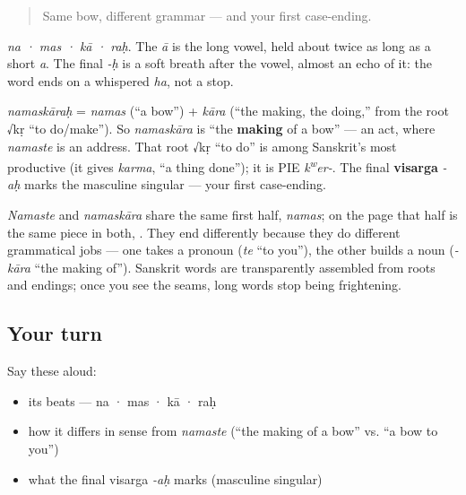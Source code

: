 \begin{quote}
Same bow, different grammar — and your first case-ending.
\end{quote}

\begin{sounds}
\emph{na · mas · kā · raḥ}. The \emph{ā} is the long vowel, held about twice as long as a short \emph{a}. The final \emph{-ḥ} is a soft breath after the vowel, almost an echo of it: the word ends on a whispered \emph{ha}, not a stop.
\end{sounds}

\begin{cousinweb}
\emph{namaskāraḥ} = \emph{namas} (\textquotedblleft{}a bow\textquotedblright{}) + \emph{kāra} (\textquotedblleft{}the making, the doing,\textquotedblright{} from the root √kṛ \textquotedblleft{}to do/make\textquotedblright{}). So \emph{namaskāra} is \textquotedblleft{}the \textbf{making} of a bow\textquotedblright{} — an act, where \emph{namaste} is an address. That root √kṛ \textquotedblleft{}to do\textquotedblright{} is among Sanskrit's most productive (it gives \emph{karma}, \textquotedblleft{}a thing done\textquotedblright{}); it is PIE \emph{k\textsuperscript{w}er-}. The final \textbf{visarga} \emph{-aḥ} marks the masculine singular — your first case-ending.
\end{cousinweb}

\begin{grammarlens}[title={Grammar Lens}]
\emph{Namaste} and \emph{namaskāra} share the same first half, \emph{namas}; on the page that half is the same piece in both, \textbf{}. They end differently because they do different grammatical jobs — one takes a pronoun (\emph{te} \textquotedblleft{}to you\textquotedblright{}), the other builds a noun (\emph{-kāra} \textquotedblleft{}the making of\textquotedblright{}). Sanskrit words are transparently assembled from roots and endings; once you see the seams, long words stop being frightening.
\end{grammarlens}

\subsection*{Your turn}
Say these aloud:

\begin{itemize}
\raggedright
  \item its beats — na · mas · kā · raḥ
  \item how it differs in sense from \emph{namaste} (\textquotedblleft{}the making of a bow\textquotedblright{} vs. \textquotedblleft{}a bow to you\textquotedblright{})
  \item what the final visarga \emph{-aḥ} marks (masculine singular)
\end{itemize}

